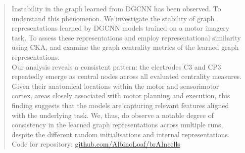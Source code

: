 \begin{abstract}
\noindent Instability in the graph learned from DGCNN has been observed. To understand this phenomenon. We investigate the stability of graph representations learned by DGCNN models trained on a motor imagery task. To assess these representations and employ representational similarity using CKA, and examine the graph centrality metrics of the learned graph representations.
\vspace{0.5em}\\
Our analysis reveals a consistent pattern: the electrodes C3 and CP3 repeatedly emerge as central nodes across all evaluated centrality measures. Given their anatomical locations within the motor and sensorimotor cortex, areas closely associated with motor planning and execution, this finding suggests that the models are capturing relevant features aligned with the underlying task.
We, thus, do observe a notable degree of consistency in the learned graph representations across multiple runs, despite the different random initialisations and internal representations. 
\vspace{0.5em}\\
Code for repository: \hyperlink{https://github.com/AlbinoLoaf/brAIncells}{github.com/AlbinoLoaf/brAIncells}
\end{abstract}
